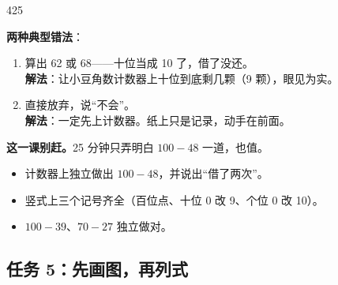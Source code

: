 \begin{lesson}{4}{25}
\begin{pitbox}
\textbf{两种典型错法}：
\begin{enumerate}[label=\arabic*、]
  \item 算出 62 或 68——十位当成 10 了，借了没还。\\
\textbf{解法}：让小豆角数计数器上十位到底剩几颗（9 颗），眼见为实。
  \item 直接放弃，说“不会”。\\
\textbf{解法}：一定先上计数器。纸上只是记录，动手在前面。
\end{enumerate}
\textbf{这一课别赶。}25 分钟只弄明白 $100-48$ 一道，也值。
\end{pitbox}

\begin{passbox}
\begin{itemize}
  \item 计数器上独立做出 $100-48$，并说出“借了两次”。
  \item 竖式上三个记号齐全（百位点、十位 0 改 9、个位 0 改 10）。
  \item $100-39$、$70-27$ 独立做对。
\end{itemize}
\end{passbox}
\end{lesson}

\subsection{任务 5：先画图，再列式}

